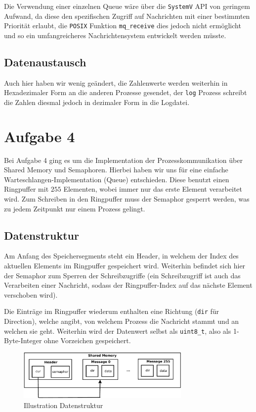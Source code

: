 \documentclass[12pt, a4paper]{scrartcl}
\begin{document}
Die Verwendung einer einzelnen Queue wäre über die \texttt{SystemV} API von geringem 
Aufwand, da diese den spezifischen Zugriff auf Nachrichten mit einer bestimmten 
Priorität erlaubt, die \texttt{POSIX} Funktion \texttt{mq\_receive} dies jedoch nicht 
ermöglicht und so ein umfangreicheres Nachrichtensystem entwickelt werden müsste.

\subsection{Datenaustausch}
Auch hier haben wir wenig geändert, die Zahlenwerte werden weiterhin in Hexadezimaler Form an die anderen Prozesse gesendet, der \texttt{log} Prozess schreibt die Zahlen diesmal jedoch in dezimaler Form in die Logdatei.

\clearpage
\section{Aufgabe 4}

Bei Aufgabe 4 ging es um die Implementation der Prozesskommunikation über
Shared Memory und Semaphoren. Hierbei haben wir uns für eine einfache
Warteschlangen-Implementation (Queue) entschieden. Diese benutzt einen
Ringpuffer mit $255$ Elementen, wobei immer nur das erste Element verarbeitet
wird. Zum Schreiben in den Ringpuffer muss der Semaphor gesperrt werden, was zu
jedem Zeitpunkt nur einem Prozess gelingt.

\subsection{Datenstruktur}

Am Anfang des Speichersegments steht ein Header, in welchem der Index des
aktuellen Elements im Ringpuffer gespeichert wird. Weiterhin befindet sich hier
der Semaphor zum Sperren der Schreibzugriffe (ein Schreibzugriff ist auch das
Verarbeiten einer Nachricht, sodass der Ringpuffer-Index auf das nächste
Element verschoben wird).
\np

Die Einträge im Ringpuffer wiederum enthalten eine Richtung (\texttt{dir} für
Direction), welche angibt, von welchem Prozess die Nachricht stammt und an
welchen sie geht. Weiterhin wird der Datenwert selbst als \texttt{uint8\_t},
also als 1-Byte-Integer ohne Vorzeichen gespeichert.

\begin{figure}[h!]
\centering
\caption{Illustration Datenstruktur}
\includegraphics[width=0.75\textwidth]{a4-crop}
\end{figure}
\end{document}
